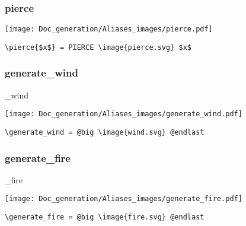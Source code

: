 \documentclass{article}
\begin{document}
\subsubsection{pierce}
\begin{minipage}{0.45\linewidth}
\raggedright
\begin{spverbatim}
\end{spverbatim}
\end{minipage}
\begin{minipage}{0.45\linewidth}
\raggedleft
\texttt{[image: Doc\_generation/Aliases\_images/pierce.pdf]}
\end{minipage}
\begin{center}
\begin{BVerbatim}
\pierce{$x$} = PIERCE \image{pierce.svg} $x$
\end{BVerbatim}
\end{center}

\subsubsection{generate\_wind}
\begin{minipage}{0.45\linewidth}
\raggedright
\begin{spverbatim}
\generate_wind
\end{spverbatim}
\end{minipage}
\begin{minipage}{0.45\linewidth}
\raggedleft
\texttt{[image: Doc\_generation/Aliases\_images/generate\_wind.pdf]}
\end{minipage}
\begin{center}
\begin{BVerbatim}
\generate_wind = @big \image{wind.svg} @endlast
\end{BVerbatim}
\end{center}

\subsubsection{generate\_fire}
\begin{minipage}{0.45\linewidth}
\raggedright
\begin{spverbatim}
\generate_fire
\end{spverbatim}
\end{minipage}
\begin{minipage}{0.45\linewidth}
\raggedleft
\texttt{[image: Doc\_generation/Aliases\_images/generate\_fire.pdf]}
\end{minipage}
\begin{center}
\begin{BVerbatim}
\generate_fire = @big \image{fire.svg} @endlast
\end{BVerbatim}
\end{center}
\end{document}

